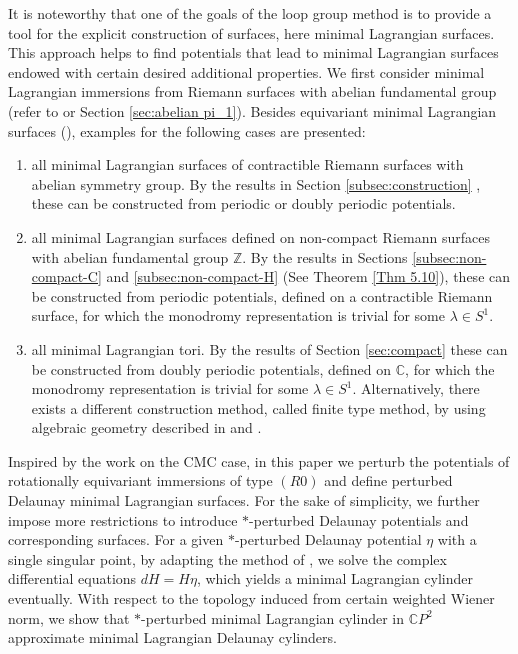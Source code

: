 \documentclass[a4paper,11pt]{amsart}
\theoremstyle{definition}
\numberwithin{equation}{section}
\newcommand{\C}{\mathbb{C}}
\newcommand{\Z}{\mathbb{Z}}
\begin{document}
It is noteworthy that one of the goals of the loop group method is to provide a tool for the explicit construction of surfaces, here minimal Lagrangian surfaces.  This approach helps  to find potentials  that lead to  minimal Lagrangian surfaces endowed with certain  desired additional properties. 
We first consider minimal Lagrangian immersions from Riemann surfaces with abelian fundamental group 
(refer to \cite{Farkas-Kra} or Section \ref{sec:abelian pi_1}).
Besides equivariant minimal Lagrangian surfaces (\cite{DoMaNL, DoMaEX}),  examples 
for the following cases are presented:
%
\begin{enumerate}
\item all minimal Lagrangian surfaces of contractible Riemann surfaces with abelian symmetry group.
By the results in  Section \ref{subsec:construction} ,  these can be constructed from periodic or doubly periodic potentials.
\item all minimal Lagrangian surfaces defined on  non-compact Riemann surfaces with abelian fundamental group $\Z$.
By the results in Sections \ref{subsec:non-compact-C} and \ref{subsec:non-compact-H} (See Theorem \ref{Thm 5.10}),  these can be constructed from periodic potentials, defined on a contractible Riemann surface, for which the monodromy representation is trivial for some $\lambda \in S^1.$

\item  all minimal Lagrangian tori. By the results  of Section \ref{sec:compact} these can be constructed from doubly periodic potentials, defined on $\C$, for which the monodromy representation is trivial for some $\lambda \in S^1$.
Alternatively, there exists a different  construction method, called finite type method, by using algebraic geometry described in  \cite{MM} and \cite{McIn}.
\end{enumerate}



 Inspired by the work \cite{DW08} on the CMC case, in this paper we perturb the potentials of rotationally equivariant immersions of type $(R0)$ and 
define perturbed Delaunay minimal Lagrangian surfaces. For the sake of simplicity, we further impose more restrictions to introduce $*$-perturbed Delaunay potentials and corresponding surfaces. For a given $*$-perturbed Delaunay potential $\eta$ with a single singular point, by adapting the method of \cite{Sch-Sch}, we solve the complex differential equations $dH=H\eta$, which yields a  minimal Lagrangian cylinder eventually. With respect to the topology induced from certain weighted Wiener norm, we show that $*$-perturbed minimal Lagrangian cylinder in $\C P^2$  approximate minimal Lagrangian Delaunay cylinders. 
\end{document}
